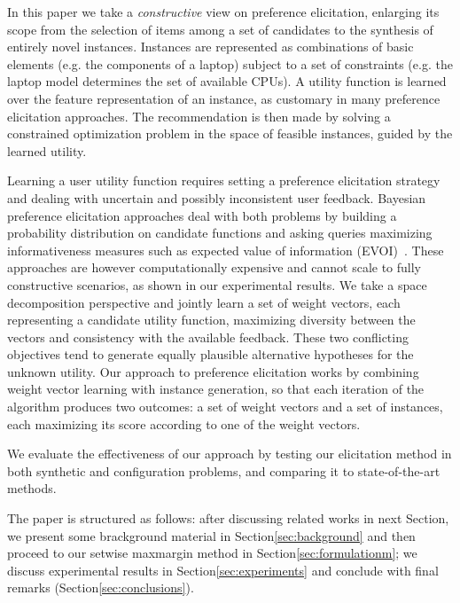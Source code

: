 \documentclass{article}
\renewcommand\[{\begin{equation}}
\renewcommand\]{\end{equation}}
\newcommand{\andrea}[1]{{\bf \textcolor{blue}{{\fbox{Andrea:} #1}}}}
\begin{document}
In this paper we take a {\em constructive} view on preference
elicitation, enlarging its scope from the selection of items among a
set of candidates to the synthesis of entirely novel
instances. Instances are represented as combinations of basic elements
(e.g. the components of a laptop) subject to a set of constraints
(e.g. the laptop model determines the set of available CPUs). A
utility function is learned over the feature representation of an
instance, as customary in many preference elicitation approaches. The
recommendation is then made by solving a constrained optimization
problem in the space of feasible instances, guided by the learned
utility. 


Learning a user utility function requires setting a preference
elicitation strategy and dealing with uncertain and possibly
inconsistent user feedback. Bayesian preference elicitation approaches
deal with both problems by building a probability distribution on
candidate functions and asking queries maximizing informativeness
measures such as expected value of information (EVOI)~\cite{}. These
approaches are however computationally expensive and cannot scale to
fully constructive scenarios, as shown in our experimental results.
We take a space decomposition perspective and jointly learn a set of
weight vectors, each representing a candidate utility function,
maximizing diversity between the vectors and consistency with the
available feedback. These two conflicting objectives tend to generate
equally plausible alternative hypotheses for the unknown
utility. 
Our approach to preference elicitation works by combining weight vector
learning with instance generation, so that each iteration of the
algorithm produces two outcomes: a set of weight vectors and a set of
instances, each maximizing its score according to one of the weight
vectors. 

We evaluate the effectiveness of our approach by testing our elicitation method
in both synthetic and configuration problems, and comparing it to state-of-the-art
methods.

The paper is structured as follows: after discussing related works in next Section,
we present some brackground material in Section\ref{sec:background} 
and then proceed to our setwise maxmargin method in Section\ref{sec:formulationm}; 
we discuss experimental results in Section\ref{sec:experiments}
and conclude with final remarks (Section\ref{sec:conclusions}).
\end{document}
